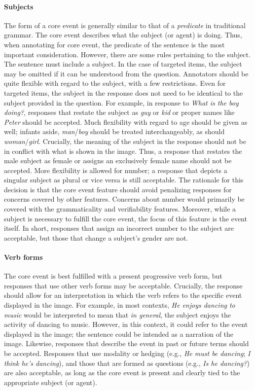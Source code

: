 \documentclass[12pt,notitlepage]{article}
\begin{document}
\paragraph{Subjects} \label{para:core-event-subjects} The form of a core event is generally similar to that of a \textit{predicate} in traditional grammar. The core event describes what the subject (or agent) is doing. Thus, when annotating for core event, the predicate of the sentence is the most important consideration. However, there are some rules pertaining to the subject. The sentence must include a subject. In the case of targeted items, the subject may be omitted if it can be understood from the question. Annotators should be quite flexible with regard to the subject, with a few restrictions. Even for targeted items, the subject in the response does not need to be identical to the subject provided in the question. For example, in response to \textit{What is the boy doing?}, responses that restate the subject as \textit{guy} or \textit{kid} or proper names like \textit{Peter} should be accepted. Much flexibility with regard to age should be given as well; infants aside, \textit{man}/\textit{boy} should be treated interchangeably, as should \textit{woman}/\textit{girl}. Crucially, the meaning of the subject in the response should not be in conflict with what is shown in the image. Thus, a response that restates the male subject as female or assigns an exclusively female name should not be accepted. More flexibility is allowed for number; a response that depicts a singular subject as plural or vice versa is still acceptable. The rationale for this decision is that the core event feature should avoid penalizing responses for concerns covered by other features. Concerns about number would primarily be covered with the grammaticality and verifiability features. Moreover, while a subject is necessary to fulfill the core event, the focus of this feature is the event itself. In short, responses that assign an incorrect number to the subject  are acceptable, but those that change a subject's gender are not.

\paragraph{Verb forms}
The core event is best fulfilled with a present progressive verb form, but responses that use other verb forms may be acceptable. Crucially, the response should allow for an interpretation in which the verb refers to the specific event displayed in the image. For example, in most contexts, \textit{He enjoys dancing to music} would be interpreted to mean that \textit{in general}, the subject enjoys the activity of dancing to music. However, in this context, it could refer to the event displayed in the image; the sentence could be intended as a narration of the image. Likewise, responses that describe the event in past or future terms should be accepted. Responses that use modality or hedging (e.g., \textit{He must be dancing}; \textit{I think he's dancing}), and those that are formed as questions (e.g., \textit{Is he dancing?}) are also acceptable, as long as the core event is present and clearly tied to the appropriate subject (or agent).
\end{document}
